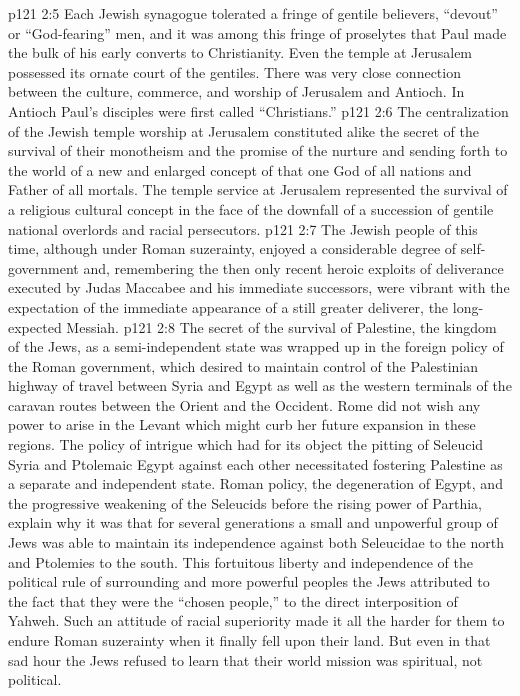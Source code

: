 \vs p121 2:5 Each Jewish synagogue tolerated a fringe of gentile believers, “devout” or “God\hyp{}fearing” men, and it was among this fringe of proselytes that Paul made the bulk of his early converts to Christianity. Even the temple at Jerusalem possessed its ornate court of the gentiles. There was very close connection between the culture, commerce, and worship of Jerusalem and Antioch. In Antioch Paul’s disciples were first called “Christians.”
\vs p121 2:6 The centralization of the Jewish temple worship at Jerusalem constituted alike the secret of the survival of their monotheism and the promise of the nurture and sending forth to the world of a new and enlarged concept of that one God of all nations and Father of all mortals. The temple service at Jerusalem represented the survival of a religious cultural concept in the face of the downfall of a succession of gentile national overlords and racial persecutors.
\vs p121 2:7 \pc The Jewish people of this time, although under Roman suzerainty, enjoyed a considerable degree of self\hyp{}government and, remembering the then only recent heroic exploits of deliverance executed by Judas Maccabee and his immediate successors, were vibrant with the expectation of the immediate appearance of a still greater deliverer, the long\hyp{}expected Messiah.
\vs p121 2:8 The secret of the survival of Palestine, the kingdom of the Jews, as a semi\hyp{}independent state was wrapped up in the foreign policy of the Roman government, which desired to maintain control of the Palestinian highway of travel between Syria and Egypt as well as the western terminals of the caravan routes between the Orient and the Occident. Rome did not wish any power to arise in the Levant which might curb her future expansion in these regions. The policy of intrigue which had for its object the pitting of Seleucid Syria and Ptolemaic Egypt against each other necessitated fostering Palestine as a separate and independent state. Roman policy, the degeneration of Egypt, and the progressive weakening of the Seleucids before the rising power of Parthia, explain why it was that for several generations a small and unpowerful group of Jews was able to maintain its independence against both Seleucidae to the north and Ptolemies to the south. This fortuitous liberty and independence of the political rule of surrounding and more powerful peoples the Jews attributed to the fact that they were the “chosen people,” to the direct interposition of Yahweh. Such an attitude of racial superiority made it all the harder for them to endure Roman suzerainty when it finally fell upon their land. But even in that sad hour the Jews refused to learn that their world mission was spiritual, not political.
